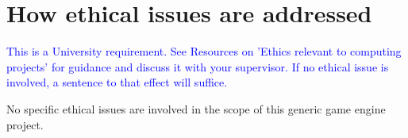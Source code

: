 \documentclass[acmtog, nonacm]{acmart}
\begin{document}
\section{How ethical issues are addressed}
\textcolor{blue}{This is a University requirement. See Resources on 'Ethics relevant to computing projects' for guidance and discuss it with your supervisor. If no ethical issue is involved, a sentence to that effect will suffice.}

No specific ethical issues are involved in the scope of this generic game engine project.
\end{document}
